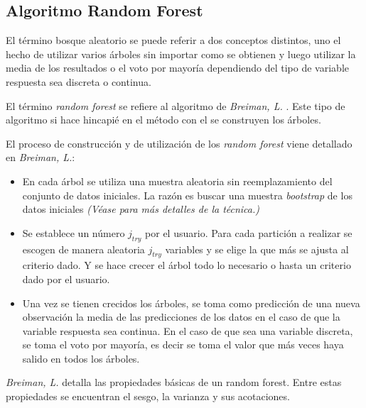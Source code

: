\subsection{Algoritmo Random Forest}

\noindent El término bosque aleatorio se puede referir a dos conceptos distintos, uno el hecho de utilizar varios árboles sin importar como se obtienen y luego utilizar la media de los resultados o el voto por mayoría dependiendo del tipo de variable respuesta sea discreta o continua. 

\noindent El término \emph{random forest} se refiere al algoritmo de \emph{Breiman, L.} \cite{Breiman 2001}. Este tipo de algoritmo si hace hincapié en el  método con el se construyen los árboles. 

\noindent El proceso de construcción y de utilización de los \emph{random forest} viene detallado en \emph{Breiman, L.}\cite{Breiman 2004}:
\begin{itemize}
\item En cada árbol se utiliza una muestra aleatoria sin reemplazamiento del conjunto de datos iniciales. La razón es buscar una muestra \emph{bootstrap} de los datos iniciales \emph{(Véase \cite{Hesterberg 2011} para más detalles de la técnica.)}
\item Se establece un número $j_{try}$ por el usuario. Para cada partición a realizar se escogen de manera aleatoria $j_{try}$ variables y se elige la que más se ajusta al criterio dado. Y se hace crecer el árbol todo lo necesario o hasta un criterio dado por el usuario. 
 
\item Una vez se tienen crecidos los árboles, se toma como predicción de una nueva observación la media de las predicciones de los datos en el caso de que la variable respuesta sea continua. En el caso de que sea una variable discreta, se toma el voto por mayoría, es decir se toma el valor que más veces haya salido en todos los árboles. 
\end{itemize}

\noindent \emph{Breiman, L.} \cite {Breiman 2004} detalla las propiedades básicas de un random forest. Entre estas propiedades se encuentran el sesgo, la varianza y sus acotaciones.
